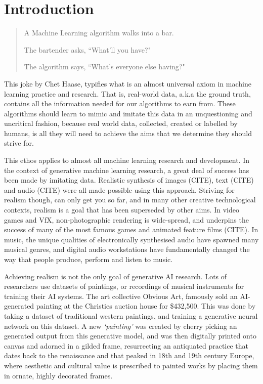 \chapter{Introduction}
\label{ch:intro}

\begin{quote}A Machine Learning algorithm walks into a bar.

The bartender asks, ``What'll you have?"


The algorithm says, ``What's everyone else having?" \citep{haase2017bar} \end{quote}

This joke by Chet Haase, typifies what is an almost universal axiom in machine learning practice and research. 
That is, real-world data, a.k.a the ground truth, contains all the information needed for our algorithms to earn from. 
These algorithms should learn to mimic and imitate this data in an unquestioning and uncritical fashion, because real world data, collected, created or labelled by humans, is all they will need to achieve the aims that we determine they should strive for.

This ethos applies to almost all machine learning research and development. In the context of generative machine learning research, a great deal of success has been made by imitating data. 
Realistic synthesis of images (CITE), text (CITE) and audio (CITE) were all made possible using this approach. 
Striving for realism though, can only get you so far, and in many other creative technological contexts, realism is a goal that has been superseded by other aims. 
In video games and VfX, non-photographic rendering is wide-spread, and underpins the success of many of the most famous games and animated feature films (CITE). 
In music, the unique qualities of electronically synthesised audio have spawned many musical genres, and digital audio workstations have fundamentally changed the way that people produce, perform and listen to music.

Achieving realism is not the only goal of generative AI research. 
Lots of researchers use datasets of paintings, or recordings of musical instruments for training their AI systems. 
The art collective Obvious Art, famously sold an AI-generated painting at the Christies auction house for \$432,500. 
This was done by taking a dataset of traditional western paintings, and training a generative neural network on this dataset. 
A new \textit{`painting’} was created by cherry picking an generated output from this generative model, and was then digitally printed onto canvas and adorned in a gilded frame, resurrecting an antiquated practice that dates back to the renaissance and that peaked in 18th and 19th century Europe, where aesthetic and cultural value is prescribed to painted works by placing them in ornate, highly decorated frames.


